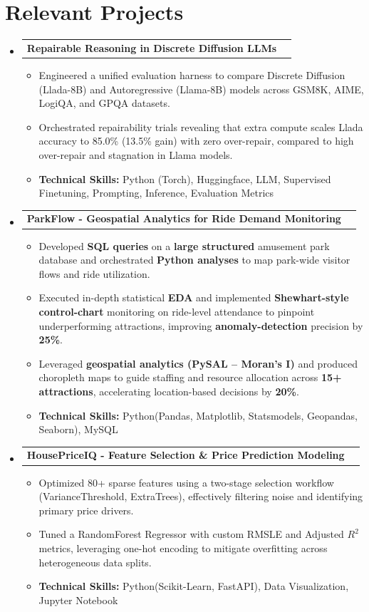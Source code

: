\documentclass[letterpaper,9pt]{article}
\makeatletter
\newcommand{\resumeItem}[1]{
  \item\small{
    {#1 \vspace{-2pt}}
  }
}
\newcommand{\resumeProjectHeading}[2]{
    \vspace{-2pt}\item
    \begin{tabular*}{0.97\textwidth}{l@{\extracolsep{\fill}}r}
      \textbf{#1} & \textit{\small #2} \\
    \end{tabular*}\vspace{-7pt}
}
\newcommand{\resumeSubHeadingListStart}{\begin{itemize}[leftmargin=0.15in, label={}]}
\newcommand{\resumeSubHeadingListEnd}{\end{itemize}}
\newcommand{\resumeItemListStart}{\begin{itemize}}
\newcommand{\resumeItemListEnd}{\end{itemize}\vspace{-5pt}}
\makeatother
\begin{document}
\section{Relevant Projects}
  \resumeSubHeadingListStart
    \resumeProjectHeading
      {\textbf{Repairable Reasoning in Discrete Diffusion LLMs}}{}
      \resumeItemListStart
        \resumeItem{Engineered a unified evaluation harness to compare Discrete Diffusion (Llada-8B) and Autoregressive (Llama-8B) models across GSM8K, AIME, LogiQA, and GPQA datasets.}
        \resumeItem{Orchestrated repairability trials revealing that extra compute scales Llada accuracy to 85.0\% (13.5\% gain) with zero over-repair, compared to high over-repair and stagnation in Llama models.}
        \resumeItem{\textbf{Technical Skills: }Python (Torch), Huggingface, LLM, Supervised Finetuning, Prompting, Inference, Evaluation Metrics}
      \resumeItemListEnd

    \resumeProjectHeading
      {\textbf{ParkFlow - Geospatial Analytics for Ride Demand Monitoring}}{}
      \resumeItemListStart
        \resumeItem{Developed \textbf{SQL queries} on a \textbf{large structured} amusement park database and orchestrated \textbf{Python analyses} to map park-wide visitor flows and ride utilization.}
        \resumeItem{Executed in-depth statistical \textbf{EDA} and implemented \textbf{Shewhart-style control-chart} monitoring on ride-level attendance to pinpoint underperforming attractions, improving \textbf{anomaly-detection} precision by \textbf{25\%}.}
        \resumeItem{Leveraged \textbf{geospatial analytics (PySAL – Moran’s I)} and produced choropleth maps to guide staffing and resource allocation across \textbf{15+ attractions}, accelerating location-based decisions by \textbf{20\%}.}
        \resumeItem{\textbf{Technical Skills: }Python(Pandas, Matplotlib, Statsmodels, Geopandas, Seaborn), MySQL}
      \resumeItemListEnd 

    \resumeProjectHeading
      {\textbf{HousePriceIQ - Feature Selection \& Price Prediction Modeling}}{}
      \resumeItemListStart
        \resumeItem{Optimized 80+ sparse features using a two-stage selection workflow (VarianceThreshold, ExtraTrees), effectively filtering noise and identifying primary price drivers.}
        \resumeItem{Tuned a RandomForest Regressor with custom RMSLE and Adjusted $R^2$ metrics, leveraging one-hot encoding to mitigate overfitting across heterogeneous data splits.}
        \resumeItem{\textbf{Technical Skills: }Python(Scikit-Learn, FastAPI), Data Visualization, Jupyter Notebook}
      \resumeItemListEnd
  \resumeSubHeadingListEnd
  
\end{document}
